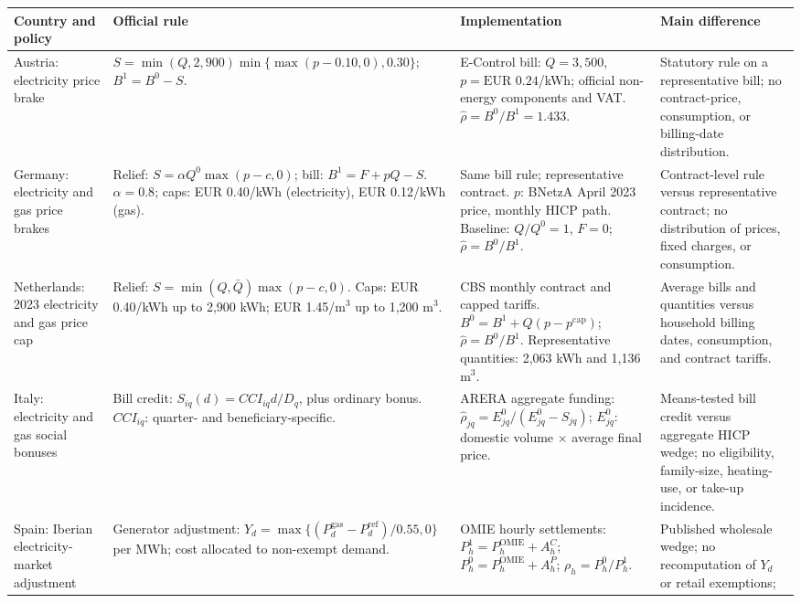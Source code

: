\noindent\begin{minipage}{\linewidth}
\centering
\fontsize{7.6}{8.5}\selectfont
\setlength{\tabcolsep}{3.5pt}
\renewcommand{\arraystretch}{1.10}
\label{tab:tariff-shield-formula-comparison}
\begin{tabularx}{\linewidth}{@{}p{1.7cm}p{4.25cm}Xp{4.0cm}@{}}
\toprule
Country and policy & Official rule & Implementation & Main difference \tabularnewline
\midrule
Austria: electricity price brake
& $S=\min(Q,2{,}900)\min\{\max(p-0.10,0),0.30\}$; $B^{1}=B^{0}-S$.
& E-Control bill: $Q=3{,}500$, $p=\text{EUR }0.24$/kWh; official non-energy
components and VAT. $\widehat{\rho}=B^{0}/B^{1}=1.433$.
& Statutory rule on a representative bill; no contract-price, consumption, or billing-date distribution. \tabularnewline
\addlinespace
Germany: electricity and gas price brakes
& Relief: $S=\alpha Q^{0}\max(p-c,0)$; bill: $B^{1}=F+pQ-S$.
$\alpha=0.8$; caps: EUR 0.40/kWh (electricity), EUR 0.12/kWh (gas).
& Same bill rule; representative contract. $p$: BNetzA April 2023 price,
monthly HICP path. Baseline: $Q/Q^{0}=1$, $F=0$;
$\widehat{\rho}=B^{0}/B^{1}$.
& Contract-level rule versus representative contract; no distribution of
prices, fixed charges, or consumption. \tabularnewline
\addlinespace
Netherlands: 2023 electricity and gas price cap
& Relief: $S=\min(Q,\bar Q)\max(p-c,0)$. Caps: EUR 0.40/kWh up to 2,900 kWh;
EUR 1.45/m$^{3}$ up to 1,200 m$^{3}$.
& CBS monthly contract and capped tariffs. $B^{0}=B^{1}+Q(p-p^{\mathrm{cap}})$;
$\widehat{\rho}=B^{0}/B^{1}$. Representative quantities: 2,063 kWh and 1,136 m$^{3}$.
& Average bills and quantities versus household billing dates, consumption,
and contract tariffs. \tabularnewline
\addlinespace
Italy: electricity and gas social bonuses
& Bill credit: $S_{iq}(d)=CCI_{iq}d/D_q$, plus ordinary bonus. $CCI_{iq}$:
quarter- and beneficiary-specific.
& ARERA aggregate funding:
$\widehat{\rho}_{jq}=E^{0}_{jq}/(E^{0}_{jq}-S_{jq})$;
$E^{0}_{jq}$: domestic volume $\times$ average final price.
& Means-tested bill credit versus aggregate HICP wedge; no eligibility,
family-size, heating-use, or take-up incidence. \tabularnewline
\addlinespace
Spain: Iberian electricity-market adjustment
& Generator adjustment: $Y_d=\max\{(P^{\mathrm{gas}}_d-P^{\mathrm{ref}}_d)/0.55,0\}$
per MWh; cost allocated to non-exempt demand.
& OMIE hourly settlements: $P^{1}_h=P^{\mathrm{OMIE}}_h+A^{C}_h$;
$P^{0}_h=P^{\mathrm{OMIE}}_h+A^{P}_h$; $\rho_h=P^{0}_h/P^{1}_h$.
& Published wholesale wedge; no recomputation of $Y_d$ or retail exemptions;

\end{tabularx}
\end{minipage}
